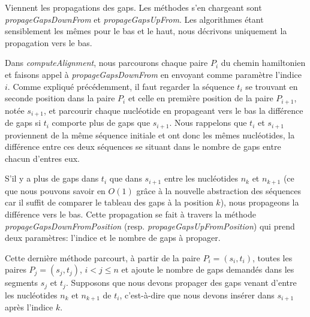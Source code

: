 Viennent les propagations des gaps.
Les méthodes s'en chargeant sont
\emph{propageGapsDownFrom} et \emph{propageGapsUpFrom}. Les algorithmes étant
sensiblement les mêmes pour le bas et le haut, nous décrivons uniquement la
propagation vers le bas.

Dans \emph{computeAlignment}, nous parcourons chaque paire $P_{i}$ du chemin
hamiltonien et faisons appel à \emph{propageGapsDownFrom} en envoyant comme
paramètre l'indice $i$. Comme expliqué précédemment, il faut regarder la
séquence $t_{i}$ se trouvant en seconde position dans la paire $P_{i}$ et celle en
première position de la paire $P_{i + 1}$, notée $s_{i + 1}$, et parcourir
chaque nucléotide en propageant vers le bas la différence de gaps si $t_{i}$
comporte plus de gaps que $s_{i + 1}$. Nous rappelons que $t_{i}$ et $s_{i +
1}$ proviennent de la même séquence initiale et ont donc les mêmes nucléotides,
la différence entre ces deux séquences se situant dans le nombre de gaps entre
chacun d'entres eux.

S'il y a plus de gaps dans $t_{i}$ que dans $s_{i + 1}$ entre les
nucléotides $n_{k}$ et $n_{k + 1}$ (ce que nous pouvons savoir en $O(1)$ grâce à
la nouvelle abstraction des séquences car il suffit de comparer le tableau des
gaps à la position $k$), nous propageons la différence vers le bas.
Cette propagation se fait à travers la méthode
\emph{propageGapsDownFromPosition} (resp. \emph{propageGapsUpFromPosition}) qui
prend deux paramètres: l'indice et le nombre de gaps à propager.

Cette dernière méthode parcourt, à partir de la paire $P_{i} = (s_{i}, t_{i})$,
toutes les paires $P_{j} = (s_{j}, t_{j})$, $i < j \leq n$ et ajoute le nombre
de gaps demandés dans les segments $s_{j}$ et $t_{j}$. Supposons que nous devons
propager des gaps venant d'entre les nucléotides $n_{k}$ et $n_{k + 1}$ de
$t_{i}$, c'est-à-dire que nous devons insérer dans $s_{i + 1}$ après l'indice
$k$.

